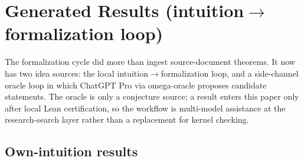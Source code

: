 \documentclass[11pt]{article}
\begin{document}
\section{\texorpdfstring{Generated Results (intuition$\to$formalization loop)}{Generated Results (intuition to formalization loop)}}

The formalization cycle did more than ingest source-document theorems.  It now has two idea sources: the local intuition$\to$formalization loop, and a side-channel oracle loop in which ChatGPT Pro via omega-oracle proposes candidate statements.  The oracle is only a conjecture source; a result enters this paper only after local Lean certification, so the workflow is multi-model assistance at the research-search layer rather than a replacement for kernel checking.

\subsection*{Own-intuition results}
\end{document}
